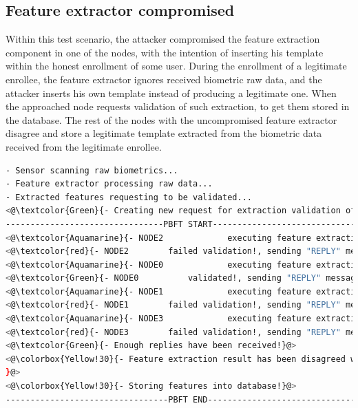 \subsection{Feature extractor compromised}
\label{Feature extractor compromised}
Within this test scenario, the attacker compromised the feature extraction component in one of the nodes, with the intention of inserting his template within the honest enrollment of some user. During the enrollment of a legitimate enrollee, the feature extractor ignores received biometric raw data, and the attacker inserts his own template instead of producing a legitimate one. When the approached node requests validation of such extraction, to get them stored in the database. The rest of the nodes with the uncompromised feature extractor disagree and store a legitimate template extracted from the biometric data received from the legitimate enrollee. 
\begin{lstlisting}[language=bash,frame=single,breaklines={true}, caption={Terminal output for enrollment from compromised node.},captionpos=b, label={EnrollmentCompromisedTerminalOutput}]
- Sensor scanning raw biometrics...
- Feature extractor processing raw data...
- Extracted features requesting to be validated...
<@\textcolor{Green}{- Creating new request for extraction validation of SUCCESS enrollment!}@>
--------------------------------PBFT START---------------------------------
<@\textcolor{Aquamarine}{- NODE2			 executing feature extraction}@>
<@\textcolor{red}{- NODE2 		 failed validation!, sending "REPLY" message!}@>
<@\textcolor{Aquamarine}{- NODE0			 executing feature extraction}@>
<@\textcolor{Green}{- NODE0 		 validated!, sending "REPLY" message!}@>
<@\textcolor{Aquamarine}{- NODE1			 executing feature extraction}@>
<@\textcolor{red}{- NODE1 		 failed validation!, sending "REPLY" message!}@>
<@\textcolor{Aquamarine}{- NODE3			 executing feature extraction}@>
<@\textcolor{red}{- NODE3 		 failed validation!, sending "REPLY" message!}@>
<@\textcolor{Green}{- Enough replies have been received!}@>
<@\colorbox{Yellow!30}{- Feature extraction result has been disagreed with, result determined!
}@>
<@\colorbox{Yellow!30}{- Storing features into database!}@>
---------------------------------PBFT END----------------------------------
\end{lstlisting}
